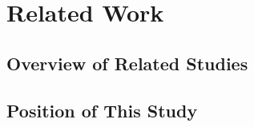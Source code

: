 \chapter{Related Work}
\label{chap:related-work}

\section{Overview of Related Studies}
\label{sec:related-studies}

\section{Position of This Study}
\label{sec:position}
